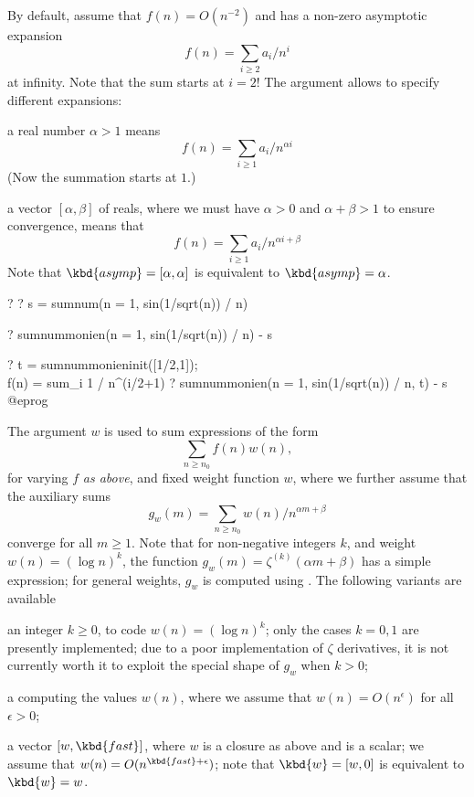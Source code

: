 By default, assume that $f(n) = O(n^{-2})$ and has a non-zero asymptotic
expansion
$$f(n) = \sum_{i\geq 2} a_i / n^i$$
at infinity. Note that the sum starts at $i = 2$! The argument 
allows to specify different expansions:

\item a real number $\alpha > 1$ means
 $$f(n) = \sum_{i\geq 1} a_i / n^{\alpha i}$$
(Now the summation starts at $1$.)

\item a vector $[\alpha,\beta]$ of reals, where we must have $\alpha > 0$
and $\alpha + \beta > 1$ to ensure convergence, means that
 $$f(n) = \sum_{i\geq 1} a_i / n^{\alpha i + \beta}$$
Note that $\kbd{asymp} = [\alpha, \alpha]$ is equivalent to
$\kbd{asymp}=\alpha$.

\bprog
? 
? s = sumnum(n = 1, sin(1/sqrt(n)) / n)

? sumnummonien(n = 1, sin(1/sqrt(n)) / n) - s

? t = sumnummonieninit([1/2,1]);  \\ f(n) = sum_i 1 / n^(i/2+1)
? sumnummonien(n = 1, sin(1/sqrt(n)) / n, t) - s
@eprog

The argument $w$ is used to sum expressions of the form
$$ \sum_{n\geq n_0} f(n) w(n),$$
for varying $f$ \emph{as above}, and fixed weight function $w$, where we
further assume that the auxiliary sums
$$g_w(m) = \sum_{n\geq n_0} w(n) / n^{\alpha m + \beta} $$
converge for all $m\geq 1$. Note that for non-negative integers $k$,
and weight $w(n) = (\log n)^k$, the function $g_w(m) = \zeta^{(k)}(\alpha m +
\beta)$ has a simple expression; for general weights, $g_w$ is
computed using . The following variants are available

\item an integer $k \geq 0$, to code $w(n) = (\log n)^k$;
only the cases $k = 0,1$ are presently implemented; due to a poor
implementation of $\zeta$ derivatives, it is not currently worth it
to exploit the special shape of $g_w$ when $k > 0$;

\item a  computing the values $w(n)$, where we
assume that $w(n) = O(n^\epsilon)$ for all $\epsilon > 0$;

\item a vector $[w, \kbd{fast}]$, where $w$ is a closure as above
and  is a scalar;
we assume that $w(n) = O(n^{\kbd{fast}+\epsilon})$; note that
$\kbd{w} = [w, 0]$ is equivalent to $\kbd{w} = w$.

